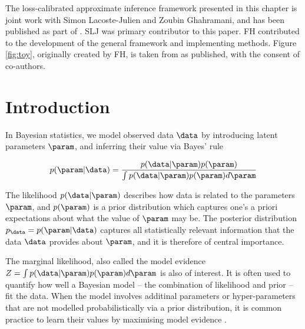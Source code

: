 \begin{summarycontributions}
The loss-calibrated approximate inference framework presented in this chapter is joint work with Simon Lacoste-Julien and Zoubin Ghahramani, and has been published as part of \citep{Lacoste2011}. SLJ was primary contributor to this paper. FH contributed to the development of the general framework and implementing methods. Figure \ref{fig:toy}, originally created by FH, is taken from \citep{Lacoste2011} as published, with the consent of co-authors.
\end{summarycontributions}


\section{Introduction}

In Bayesian statistics, we model observed data $\data$ by introducing latent parameters $\param$, and inferring their value via Bayes' rule

\begin{equation}
	p(\param\vert\data) = \frac{p(\data\vert\param) p(\param)}{\int p(\data\vert\param) p(\param) d\param}
\end{equation}

The likelihood $p(\data\vert\param)$ describes how data is related to the parameters $\param$, and $p(\param)$ is a prior distribution which captures one's a priori expectations about what the value of $\param$ may be. The posterior distribution $p_\data = p(\param\vert\data)$ captures all statistically relevant information that the data $\data$ provides about $\param$, and it is therefore of central importance.

The marginal likelihood, also called the model evidence $Z = \int p(\data\vert\param) p(\param) d\param$ is also of interest. It is often used to quantify how well a Bayesian model -- the combination of likelihood and prior -- fit the data. When the model involves additinal parameters or hyper-parameters that are not modelled probabilistically via a prior distribution, it is common practice to learn their values by maximising model evidence \citep[see \eg][Chapter 5]{Rasmussen2006}.

